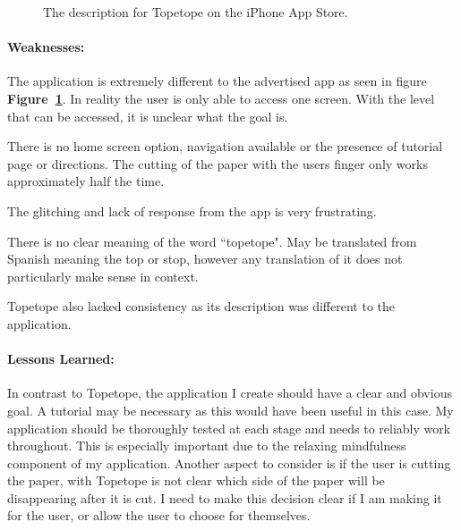 \documentclass[11pt]{article}
\begin{document}
\begin{figure}[!ht]
\begin{minipage}{0.48\textwidth}
                            \captionsetup{margin = 0.5cm}
                            \caption{The description for Topetope on the iPhone App Store.}
                            \label{fig:topeAdvertising}
                        \end{minipage}
                    \end{figure}
                    

                \paragraph{Weaknesses:}
                The application is extremely different to the advertised app as seen in figure \textbf{Figure~\ref{fig:topeAdvertising}}. In reality the user is only able to access one screen. With the level that can be accessed, it is unclear what the goal is.
                
                There is no home screen option, navigation available or the presence of tutorial page or directions. The cutting of the paper with the users finger only works approximately half the time.
                
                The glitching and lack of response from the app is very frustrating.
                
                
                There is no clear meaning of the word ``topetope". May be translated from Spanish meaning the top or stop, however any translation of it does not particularly make sense in context. 
                
                 Topetope also lacked consistency as its description was different to the application.

                \paragraph{Lessons Learned:}
                In contrast to Topetope, the application I create should have a clear and obvious goal. A tutorial may be necessary as this would have been useful in this case. My application should be thoroughly tested at each stage and needs to reliably work throughout. This is especially important due to the relaxing mindfulness component of my application. Another aspect to consider is if the user is cutting the paper, with Topetope is not clear which side of the paper will be disappearing after it is cut. I need to make this decision clear if I am making it for the user, or allow the user to choose for themselves. 
\end{document}
